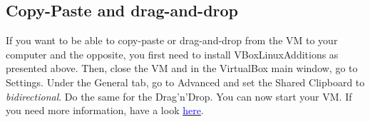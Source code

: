 \documentclass[a4paper,11pt]{article}
\begin{document}
\subsection*{Copy-Paste and drag-and-drop}
If you want to be able to copy-paste or drag-and-drop from the VM to your computer and the opposite, you first need to install VBoxLinuxAdditions as presented above.
Then, close the VM and in the VirtualBox main window, go to Settings. Under the General tab, go to Advanced and set the Shared Clipboard to \textit{bidirectional}. Do the same for the Drag'n'Drop. You can now start your VM.
If you need more information, have a look \href{https://www.howtogeek.com/187535/how-to-copy-and-paste-between-a-virtualbox-host-machine-and-a-guest-machine/}{\textcolor{blue}{here}}.
\end{document}
